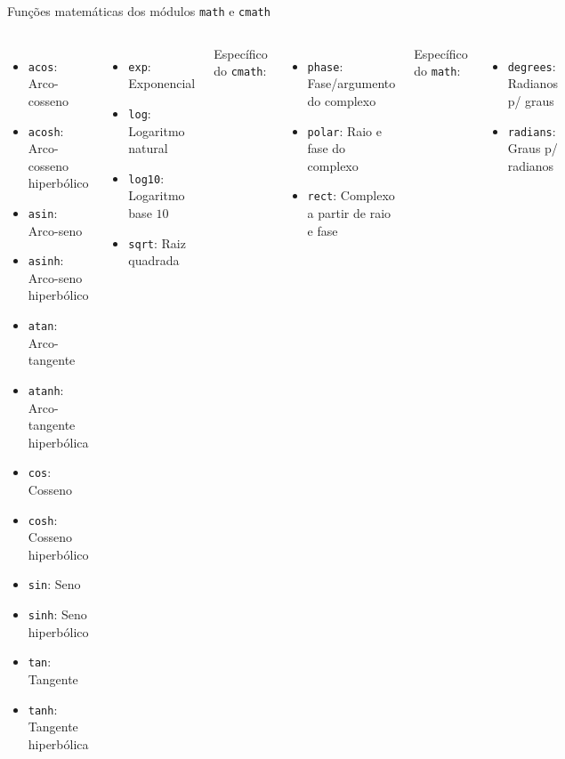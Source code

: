 \documentclass[utf8]{beamer}
\begin{document}
\begin{frame}{Funções matemáticas dos módulos
                       \texttt{math} e \texttt{cmath}}
  \begin{columns}

    \begin{itemize}
      \item \texttt{acos}: Arco-cosseno
      \item \texttt{acosh}: Arco-cosseno hiperbólico
      \item \texttt{asin}: Arco-seno
      \item \texttt{asinh}: Arco-seno hiperbólico
      \item \texttt{atan}: Arco-tangente
      \item \texttt{atanh}: Arco-tangente hiperbólica
      \item \texttt{cos}: Cosseno
      \item \texttt{cosh}: Cosseno hiperbólico
      \item \texttt{sin}: Seno
      \item \texttt{sinh}: Seno hiperbólico
      \item \texttt{tan}: Tangente
      \item \texttt{tanh}: Tangente hiperbólica
    \end{itemize}

    \begin{itemize}
      \item \texttt{exp}: Exponencial
      \item \texttt{log}: Logaritmo natural
      \item \texttt{log10}: Logaritmo base $10$
      \item \texttt{sqrt}: Raiz quadrada
    \end{itemize}

    Específico do \texttt{cmath}:
    \begin{itemize}
      \item \texttt{phase}: Fase/argumento do complexo
      \item \texttt{polar}: Raio e fase do complexo
      \item \texttt{rect}: Complexo a partir de raio e fase
    \end{itemize}

    Específico do \texttt{math}:
    \begin{itemize}
      \item \texttt{degrees}: Radianos p/ graus
      \item \texttt{radians}: Graus p/ radianos
    \end{itemize}

  \end{columns}
\end{frame}
\end{document}
